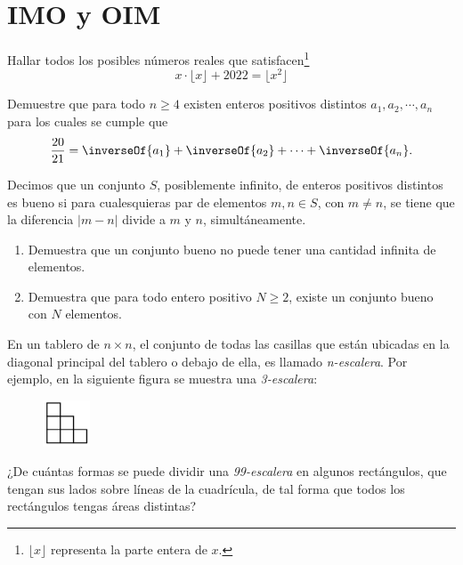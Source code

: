 \section{IMO y OIM}

\begin{section-problem}
    Hallar todos los posibles números reales que satisfacen\footnote{$\lfloor x \rfloor$ representa la parte entera de $x$.}
    \[x\cdot\lfloor x \rfloor + 2022 = \lfloor x^2 \rfloor\]
\end{section-problem}

\begin{section-problem}
    Demuestre que para todo $n \geq 4$ existen enteros positivos distintos $a_1, a_2, \cdots, a_n$ para los cuales se cumple que
    \[\frac{20}{21} = \inverseOf{a_1} + \inverseOf{a_2} + \cdots + \inverseOf{a_n}.\]
\end{section-problem}

\begin{section-problem}
    Decimos que un conjunto $S$, posiblemente infinito, de enteros positivos distintos es bueno si para cualesquieras par de elementos $m, n \in S$, con $m \neq n$, se tiene que la diferencia $|m - n|$ divide a $m$ y $n$, simultáneamente.
    \begin{enumerate}
        \item Demuestra que un conjunto bueno no puede tener una cantidad infinita de elementos.
        \item Demuestra que para todo entero positivo $N \geq 2$, existe un conjunto bueno con $N$ elementos.
    \end{enumerate}
\end{section-problem}

\begin{section-problem}
    En un tablero de $n \times n$, el conjunto de todas las casillas que están ubicadas en la diagonal principal del tablero o debajo de ella, es llamado \textit{n-escalera}.
    Por ejemplo, en la siguiente figura se muestra una \textit{3-escalera}:
    \begin{figure}[htb]
        \centering
        \includegraphics[width=1.4cm]{images/3-escalera}
    \end{figure}
    
    ¿De cuántas formas se puede dividir una \textit{99-escalera} en algunos rectángulos, que tengan sus lados sobre líneas de la cuadrícula, de tal forma que todos los rectángulos tengas áreas distintas?
\end{section-problem}

